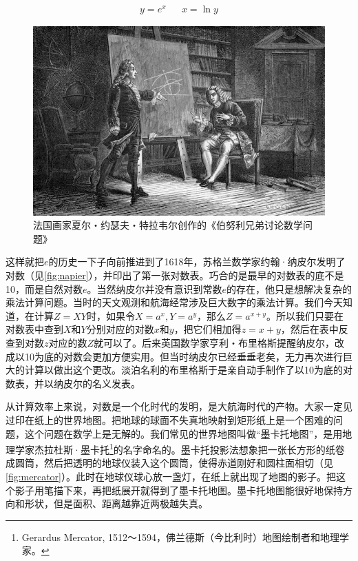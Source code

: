 \documentclass[b5paper]{ctexart}
\begin{document}
\begin{align*}
  y = e^x && x = \ln y
\end{align*}

\begin{figure}[htbp]
 \centering
 \includegraphics[scale=0.3]{img/Bernoulli-brothers}
 \caption{法国画家夏尔・约瑟夫・特拉韦尔创作的《伯努利兄弟讨论数学问题》}
 \label{fig:Bernoulli-brothers}
\end{figure}

这样就把$e$的历史一下子向前推进到了1618年，苏格兰数学家约翰·纳皮尔发明了对数（见\cref{fig:napier}），并印出了第一张对数表。巧合的是最早的对数表的底不是10，而是自然对数$e$。当然纳皮尔并没有意识到常数$e$的存在，他只是想解决复杂的乘法计算问题。当时的天文观测和航海经常涉及巨大数字的乘法计算。我们今天知道，在计算$Z = XY$时，如果令$X = a^x, Y = a^y$，那么$Z = a^{x + y}$。所以我们只要在对数表中查到$X$和$Y$分别对应的对数$x$和$y$，把它们相加得$z = x + y$，然后在表中反查到对数$z$对应的数$Z$就可以了。后来英国数学家亨利・布里格斯提醒纳皮尔，改成以10为底的对数会更加方便实用。但当时纳皮尔已经垂垂老矣，无力再次进行巨大的计算以做出这个更改。淡泊名利的布里格斯于是亲自动手制作了以10为底的对数表，并以纳皮尔的名义发表\cite{Amerson-2021}。

从计算效率上来说，对数是一个化时代的发明，是大航海时代的产物。大家一定见过印在纸上的世界地图。把地球的球面不失真地映射到矩形纸上是一个困难的问题，这个问题在数学上是无解的。我们常见的世界地图叫做“墨卡托地图”，是用地理学家杰拉杜斯·墨卡托\footnote{Gerardus Mercator, 1512～1594，佛兰德斯（今比利时）地图绘制者和地理学家。}的名字命名的。墨卡托投影法想象把一张长方形的纸卷成圆筒，然后把透明的地球仪装入这个圆筒，使得赤道刚好和圆柱面相切（见\cref{fig:mercator}）。此时在地球仪球心放一盏灯，在纸上就出现了地图的影子。把这个影子用笔描下来，再把纸展开就得到了墨卡托地图。墨卡托地图能很好地保持方向和形状，但是面积、距离越靠近两极越失真。
\end{document}
